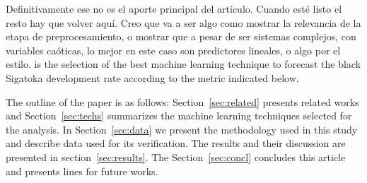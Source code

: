 %
{Definitivamente ese no es el aporte principal del artículo.  Cuando
  esté listo el resto hay que volver aquí.  Creo que va a ser algo
  como mostrar la relevancia de la etapa de preprocesamiento, o
  mostrar que a pesar de ser sistemas complejos, con variables
  caóticas, lo mejor en este caso son predictores lineales, o algo por
  el estilo.} %
% 
 is the selection of the best machine learning technique
to forecast the black Sigatoka development rate according to the
metric indicated below.

The outline of the paper is as follows: Section~\ref{sec:related}
presents related works and Section~\ref{sec:techs} summarizes the
machine learning techniques selected for the analysis. In
Section~\ref{sec:data} we present the methodology used in this study
and describe data used for its verification.  The results and their
discussion are presented in section~\ref{sec:results}.  The
Section~\ref{sec:concl} concludes this article and presents lines for
future works.

